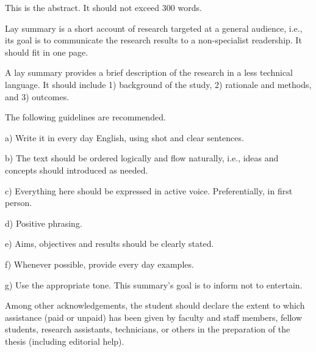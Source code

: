%
\begin{prefatory}
\frontpage
\abstract%
This is the abstract. It should not exceed $300$ words.
\dedication%
{\flushright
To whom you what to dedicate this work
}
\laysummary %
Lay summary is a short account of research targeted at a general
audience, i.e., its goal is to communicate the research results to a
non-specialist readership. It should fit in one page. 

A lay summary provides a brief description of the research in a less
technical language. It should include 1) background of the study, 2)
rationale and methods, and 3) outcomes. 

The following guidelines are recommended. 

a) Write it in every day English, using shot and clear sentences. 

b) The text should be ordered logically and flow naturally, i.e.,
ideas and concepts should introduced as needed. 

c) Everything here should be expressed in active
voice. Preferentially, in first person. 

d) Positive phrasing. 

e) Aims, objectives and results should be clearly stated. 

f) Whenever possible, provide every day examples. 

g) Use the appropriate tone. This summary's goal is to inform not to
entertain.

\acknowledgements%
Among other acknowledgements, the student should declare the
extent to which assistance (paid or unpaid) has been given by faculty
and staff members, fellow students, research assistants, technicians,
or others in the preparation of the thesis (including editorial help).


\end{prefatory}
